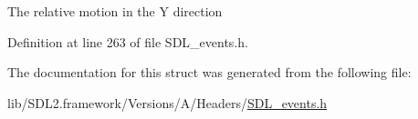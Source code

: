 The relative motion in the Y direction 

Definition at line 263 of file S\+D\+L\+\_\+events.\+h.



The documentation for this struct was generated from the following file\+:\begin{DoxyCompactItemize}
\item 
lib/\+S\+D\+L2.\+framework/\+Versions/\+A/\+Headers/\mbox{\hyperlink{_s_d_l__events_8h}{S\+D\+L\+\_\+events.\+h}}\end{DoxyCompactItemize}

